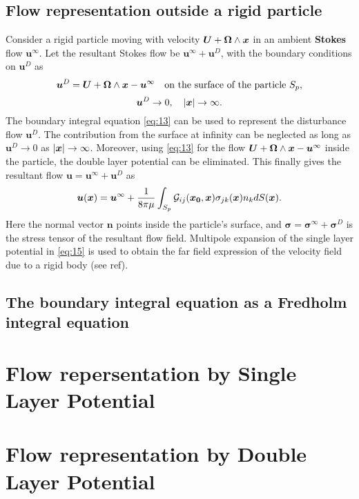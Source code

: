 \documentclass[12pt]{article}
\begin{document}
\subsection{Flow representation outside a rigid particle}

Consider a rigid particle moving with velocity $\boldsymbol{U}+\boldsymbol{\Omega} \wedge \boldsymbol{x}$ in an ambient \textbf{Stokes} flow $\boldsymbol{u}^\infty$. Let the resultant Stokes flow be $\boldsymbol{u}^\infty + \boldsymbol{u}^D$, with the boundary conditions on $\boldsymbol{u}^D$ as
$$
\boldsymbol{u}^D = \boldsymbol{U}+\boldsymbol{\Omega} \wedge \boldsymbol{x} - \boldsymbol{u}^\infty \quad  \text{on the surface of the particle } S_p,
$$
$$
\boldsymbol{u}^D \to 0, \quad |\boldsymbol{x}| \to \infty. 
$$
The boundary integral equation \eqref{eq:13} can be used to represent the disturbance flow $\boldsymbol{u}^D$. The contribution from the surface at infinity can be neglected as long as $\boldsymbol{u}^D\to 0$ as $|\boldsymbol{x}| \to \infty$. Moreover, using \eqref{eq:13} for the flow $\boldsymbol{U}+\boldsymbol{\Omega} \wedge \boldsymbol{x} - \boldsymbol{u}^\infty$ inside the particle, the double layer potential can be eliminated. This finally gives the resultant flow $\boldsymbol{u} = \boldsymbol{u}^\infty + \boldsymbol{u}^D$ as
\begin{equation}
	\label{eq:15}
	\boldsymbol{u}(\boldsymbol{x}) = \boldsymbol{u}^\infty + \frac{1}{8\pi\mu} \int_{S_p} \mathcal{G}_{ij}(\boldsymbol{x_0},\boldsymbol{x}) \sigma_{jk}(\boldsymbol{x})n_k dS(\boldsymbol{x}).
\end{equation} 
Here the normal vector $\textbf{n}$ points inside the particle's surface, and $\boldsymbol{\sigma} = \boldsymbol{\sigma}^\infty + \boldsymbol{\sigma}^D$ is the stress tensor of the resultant flow field. Multipole expansion of the single layer potential in \eqref{eq:15} is used to obtain the far field expression of the velocity field due to a rigid body (see ref).

\subsection{The boundary integral equation as a Fredholm integral equation}



\section{Flow repersentation by Single Layer Potential}

\section{Flow representation by Double Layer Potential}
\end{document}
